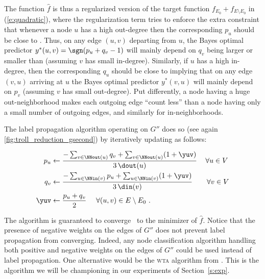 The function ${\widehat f}$ is thus a regularized version of the target function $f_{E_0} +
f_{E\setminus E_0}$ in (\ref{e:quadratic}), where the regularization term tries to enforce the extra
constraint that whenever a node $u$ has a high out-degree then the corresponding $p_u$ should be
close to \shalf. Thus, on any edge $(u,v)$ departing from $u$, the Bayes optimal predictor $y^*(u,v)
= \sgn(p_u+q_v-1)$ will mainly depend on $q_v$ being larger or smaller than \shalf{} (assuming $v$
has small in-degree). Similarly, if $u$ has a high in-degree, then the corresponding $q_u$ should be
close to \shalf{} implying that on any edge $(v,u)$ arriving at $u$ the Bayes optimal predictor
$y^*(v,u)$ will mainly depend on $p_v$ (assuming $v$ has small out-degree). Put differently, a node
having a huge out-neighborhood makes each outgoing edge \enquote{count less} than a node having only
a small number of outgoing edges, and similarly for in-neighborhoods.

The label propagation algorithm operating on $G''$ does so (see again
\autoref{fig:troll_reduction_gsecond}) by iteratively updating as follows:

\begin{align*}
  p_{u}  & \leftarrow \frac{-\sum_{v \in \NNout(u)} q_{v} + \sum_{v \in \NNout(u)} (1+\yuv)}{3\,\dout(u)}\,\quad\forall u\in V\\
  q_{v}  & \leftarrow \frac{-\sum_{u \in  \NNin(v)} p_{u} + \sum_{u \in \NNin(v) } (1+\yuv)}{3\,\din(v)}\qquad\forall v \in V\\
  \yuv & \leftarrow \frac{p_u + q_v}{2}~ \quad \forall (u,v) \in E\setminus E_0~.
\end{align*}

The algorithm is guaranteed to converge~\autocite{LabelPropa03} to the minimizer of ${\widehat f}$.
Notice that the presence of negative weights on the edges of $G''$ does not prevent label
propagation from converging. Indeed, any node classification algorithm handling both positive and
negative weights on the edges of $G''$ could be used instead of label propagation. One alternative
would be the \textsc{wta} algorithm from \autocite{WTA13}.  This is the algorithm we will be
championing in our experiments of Section~\ref{s:exp}.
